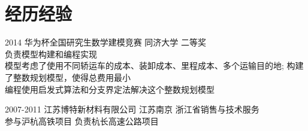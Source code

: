 \documentclass[print]{friggeri-cv} %
\begin{document}
\section{经历经验}

\begin{entrylist}
\entry
{2014}
{华为杯全国研究生数学建模竞赛}
{同济大学}
{二等奖 \\
负责模型构建和编程实现 \\
模型考虑了使用不同轿运车的成本、装卸成本、里程成本、多个运输目的地;
构建了整数规划模型，使得总费用最小\\
编程使用启发式算法和分支界定法解决这个整数规划模型
}




\entry
{2007-2011}
{江苏博特新材料有限公司}
{江苏南京}
{浙江省销售与技术服务\\
参与沪杭高铁项目
负责杭长高速公路项目}




\end{entrylist}
\end{document}
